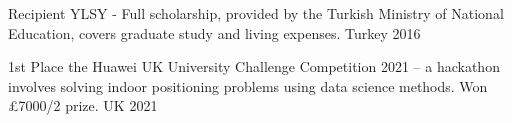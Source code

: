 


\begin{cvhonors}
  \cvhonor
    {Recipient} %
    {YLSY - Full scholarship, provided by the Turkish Ministry of National Education, covers graduate study and living expenses.} %
    {Turkey} %
    {2016} %

  \cvhonor
    {1st Place} %
    {the Huawei UK University Challenge Competition 2021 -- a hackathon involves solving indoor positioning problems using data science methods. Won £7000/2 prize.} %
    {UK} %
    {2021} %


\end{cvhonors}